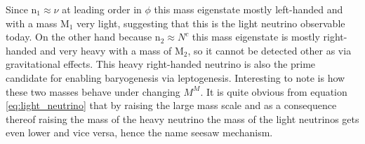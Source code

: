 Since n$_{1}\approx\nu$ at leading order in $\phi$ this mass eigenstate mostly left-handed and with a mass M$_1$ very light, suggesting that this is the light neutrino observable today.\newline\indent
On the other hand because n$_{2}\approx N^c$ this mass eigenstate is mostly right-handed and very heavy with a mass of M$_2$, so it cannot be detected other as via gravitational effects. This heavy right-handed neutrino is also the prime candidate for enabling baryogenesis via leptogenesis. \newline\indent
Interesting to note is how these two masses behave under changing $M^M$. It is quite obvious from equation \eqref{eq:light_neutrino} that by raising the large mass scale and as a consequence thereof raising the mass of the heavy neutrino the mass of the light neutrinos gets even lower and vice versa, hence the name seesaw mechanism. 
